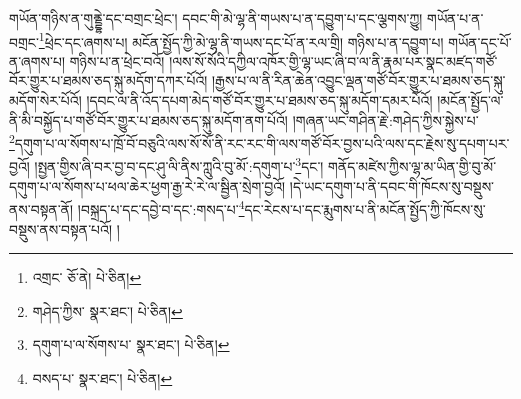 གཡོན་གཉིས་ན་གུནྡྷེ་དང་བགྲང་ཕྲེང་། དབང་གི་མེ་ལྷ་ནི་གཡས་པ་ན་དབྱུག་པ་དང་ལྕགས་ཀྱུ། གཡོན་པ་ན་བགྲང་\footnote{འགྲང་  ཅོ་ནེ།  པེ་ཅིན། }ཕྲེང་དང་ཞགས་པ། མངོན་སྤྱོད་ཀྱི་མེ་ལྷ་ནི་གཡས་དང་པོ་ན་རལ་གྲི། གཉིས་པ་ན་དབྱུག་པ། གཡོན་དང་པོ་ན་ཞགས་པ། གཉིས་པ་ན་ཕྲེང་བའོ། །ལས་སོ་སོའི་དཀྱིལ་འཁོར་གྱི་ལྷ་ཡང་ཞི་བ་ལ་ནི་རྣམ་པར་སྣང་མཛད་གཙོ་བོར་གྱུར་པ་ཐམས་ཅད་སྐུ་མདོག་དཀར་པོའོ། །རྒྱས་པ་ལ་ནི་རིན་ཆེན་འབྱུང་ལྡན་གཙོ་བོར་གྱུར་པ་ཐམས་ཅད་སྐུ་མདོག་སེར་པོའོ། །དབང་ལ་ནི་འོད་དཔག་མེད་གཙོ་བོར་གྱུར་པ་ཐམས་ཅད་སྐུ་མདོག་དམར་པོའོ། །མངོན་སྤྱོད་ལ་ནི་མི་བསྐྱོད་པ་གཙོ་བོར་གྱུར་པ་ཐམས་ཅད་སྐུ་མདོག་ནག་པོའོ། །གཞན་ཡང་གཤིན་རྗེ་:གཤེད་ཀྱིས་སྐྱེས་པ་\footnote{གཤེད་ཀྱིས་  སྣར་ཐང་།  པེ་ཅིན། }དགུག་པ་ལ་སོགས་པ་ཁྲོ་བོ་བཅུའི་ལས་སོ་སོ་ནི་རང་རང་གི་ལས་གཙོ་བོར་བྱས་པའི་ལས་དང་རྗེས་སུ་དཔག་པར་བྱའོ། །སྤྱན་གྱིས་ཞི་བར་བྱ་བ་དང་ཤུ་ལི་ནིས་ཀླུའི་བུ་མོ་:དགུག་པ་\footnote{དགུག་པ་ལ་སོགས་པ་  སྣར་ཐང་།  པེ་ཅིན། }དང་། གནོད་མཛེས་ཀྱིས་ལྷ་མ་ཡིན་གྱི་བུ་མོ་དགུག་པ་ལ་སོགས་པ་ཕལ་ཆེར་ཕྱག་རྒྱ་རེ་རེ་ལ་སྦྱིན་སྲེག་བྱའོ། །དེ་ཡང་དགུག་པ་ནི་དབང་གི་ཁོངས་སུ་བསྡུས་ནས་བསྟན་ནོ། །བསྐྲད་པ་དང་དབྱེ་བ་དང་:གསད་པ་\footnote{བསད་པ་  སྣར་ཐང་།  པེ་ཅིན། }དང་རེངས་པ་དང་རྨུགས་པ་ནི་མངོན་སྤྱོད་ཀྱི་ཁོངས་སུ་བསྡུས་ནས་བསྟན་པའོ། །
